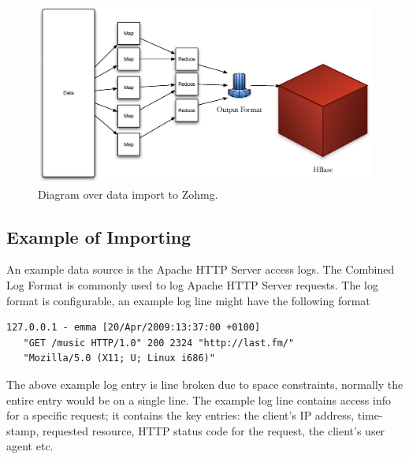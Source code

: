 \begin{figure}[h]
    \begin{center}
        \includegraphics[scale=0.40]{gfx/zohmg-import.eps}
        \caption{Diagram over data import to Zohmg.}
    \end{center}
\end{figure}



\subsection*{Example of Importing}


An example data source is the Apache HTTP Server access logs. The Combined Log
Format is commonly used to log Apache HTTP Server requests. The log format is
configurable, an example log line might have the following format

\vspace{12pt}

\begin{lstlisting}[caption=Example log line entry for the Apache HTTP Server's
Combined Log Format.,captionpos=b]
   127.0.0.1 - emma [20/Apr/2009:13:37:00 +0100]
   "GET /music HTTP/1.0" 200 2324 "http://last.fm/"
   "Mozilla/5.0 (X11; U; Linux i686)"
\end{lstlisting}

\vspace{12pt}

The above example log entry is line broken due to space constraints, normally
the entire entry would be on a single line. The example log line contains access
info for a specific request; it contains the key entries: the client's IP
address, time-stamp, requested resource, HTTP status code for the request, the
client's user agent etc.


